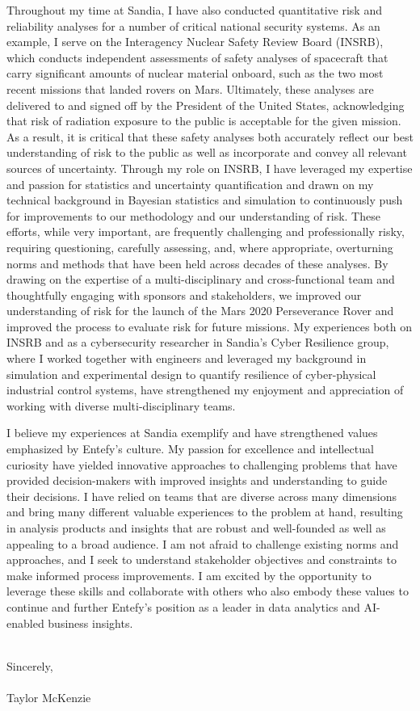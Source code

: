 \documentclass[10pt]{article}
\begin{document}
Throughout my time at Sandia, I have also conducted quantitative risk and reliability analyses for a number of critical national security systems. As an example, I serve on the Interagency Nuclear Safety Review Board (INSRB), which conducts independent assessments of safety analyses of spacecraft that carry significant amounts of nuclear material onboard, such as the two most recent missions that landed rovers on Mars. Ultimately, these analyses are delivered to and signed off by the President of the United States, acknowledging that risk of radiation exposure to the public is acceptable for the given mission. As a result, it is critical that these safety analyses both accurately reflect our best understanding of risk to the public as well as incorporate and convey all relevant sources of uncertainty. Through my role on INSRB, I have leveraged my expertise and passion for statistics and uncertainty quantification and drawn on my technical background in Bayesian statistics and simulation to continuously push for improvements to our methodology and our understanding of risk. These efforts, while very important, are frequently challenging and professionally risky, requiring questioning, carefully assessing, and, where appropriate, overturning norms and methods that have been held across decades of these analyses. By drawing on the expertise of a multi-disciplinary and cross-functional team and thoughtfully engaging with sponsors and stakeholders, we improved our understanding of risk for the launch of the Mars 2020 Perseverance Rover and improved the process to evaluate risk for future missions. My experiences both on INSRB and as a cybersecurity researcher in Sandia's Cyber Resilience group, where I worked together with engineers and leveraged my background in simulation and experimental design to quantify resilience of cyber-physical industrial control systems, have strengthened my enjoyment and appreciation of working with diverse multi-disciplinary teams.

I believe my experiences at Sandia exemplify and have strengthened values emphasized by Entefy's culture. My passion for excellence and intellectual curiosity have yielded innovative approaches to challenging problems that have provided decision-makers with improved insights and understanding to guide their decisions. I have relied on teams that are diverse across many dimensions and bring many different valuable experiences to the problem at hand, resulting in analysis products and insights that are robust and well-founded as well as appealing to a broad audience. I am not afraid to challenge existing norms and approaches, and I seek to understand stakeholder objectives and constraints to make informed process improvements. I am excited by the opportunity to leverage these skills and collaborate with others who also embody these values to continue and further Entefy's position as a leader in data analytics and AI-enabled business insights.


\noindent \\Sincerely,\\\\
Taylor McKenzie
\end{document}
